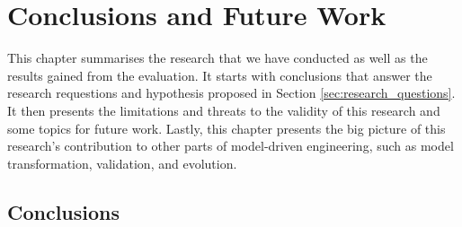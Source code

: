 \chapter{Conclusions and Future Work}
\label{ch:conclusions_and_future_work}

This chapter summarises the research that we have conducted as well as the results gained from the evaluation. It starts with conclusions that answer the research requestions and hypothesis proposed in Section \ref{sec:research_questions}. It then presents the limitations and threats to the validity of this research and some topics for future work. Lastly, this chapter presents the big picture of this research's contribution to other parts of model-driven engineering, such as model transformation, validation, and evolution. 

\section{Conclusions}
\label{conclusions_overall}
